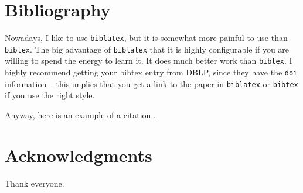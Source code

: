 \documentclass[12pt]{article}
\providecommand{\BibLatexMode}[1]{}
\providecommand{\BibTexMode}[1]{}
\renewcommand{\BibLatexMode}[1]{}
\renewcommand{\BibTexMode}[1]{#1}
\renewcommand{\BibLatexMode}[1]{#1}
\renewcommand{\BibTexMode}[1]{}
\begin{document}
\section{Bibliography}

Nowadays, I like to use \texttt{biblatex}, but it is somewhat more
painful to use than \texttt{bibtex}. The big advantage of
\texttt{biblatex} that it is highly configurable if you are willing to
spend the energy to learn it. It does much better work than
\texttt{bibtex}. I highly recommend getting your bibtex entry from
DBLP, since they have the \texttt{doi} information -- this implies
that you get a link to the paper in \texttt{biblatex} or
\texttt{bibtex} if you use the right style.

Anyway, here is an example of a citation \cite{k-spda-10}.






\section*{Acknowledgments}

Thank everyone.


\BibTexMode{%
   
   
}%
\BibLatexMode{\printbibliography}
\end{document}
